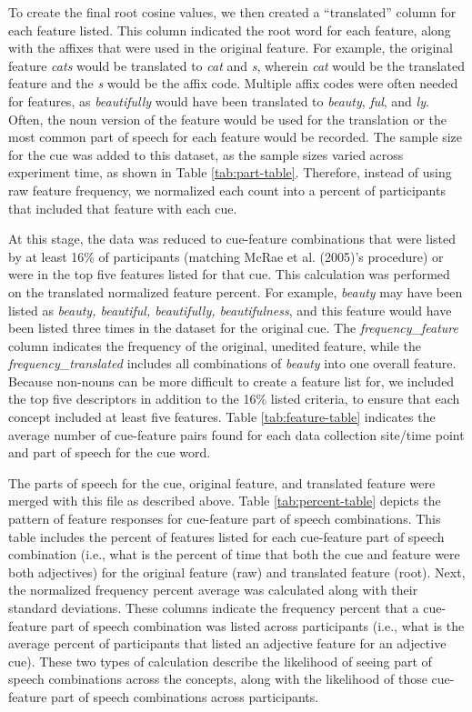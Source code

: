 \documentclass[english,man]{apa6}
\theoremstyle{definition}
\theoremstyle{definition}
\theoremstyle{definition}
\theoremstyle{remark}
\begin{document}
To create the final root cosine values, we then created a
\enquote{translated} column for each feature listed. This column
indicated the root word for each feature, along with the affixes that
were used in the original feature. For example, the original feature
\emph{cats} would be translated to \emph{cat} and \emph{s}, wherein
\emph{cat} would be the translated feature and the \emph{s} would be the
affix code. Multiple affix codes were often needed for features, as
\emph{beautifully} would have been translated to \emph{beauty},
\emph{ful}, and \emph{ly}. Often, the noun version of the feature would
be used for the translation or the most common part of speech for each
feature would be recorded. The sample size for the cue was added to this
dataset, as the sample sizes varied across experiment time, as shown in
Table \ref{tab:part-table}. Therefore, instead of using raw feature
frequency, we normalized each count into a percent of participants that
included that feature with each cue.

At this stage, the data was reduced to cue-feature combinations that
were listed by at least 16\% of participants (matching McRae et al.
(2005)'s procedure) or were in the top five features listed for that
cue. This calculation was performed on the translated normalized feature
percent. For example, \emph{beauty} may have been listed as
\emph{beauty, beautiful, beautifully, beautifulness}, and this feature
would have been listed three times in the dataset for the original cue.
The \emph{frequency\_feature} column indicates the frequency of the
original, unedited feature, while the \emph{frequency\_translated}
includes all combinations of \emph{beauty} into one overall feature.
Because non-nouns can be more difficult to create a feature list for, we
included the top five descriptors in addition to the 16\% listed
criteria, to ensure that each concept included at least five features.
Table \ref{tab:feature-table} indicates the average number of
cue-feature pairs found for each data collection site/time point and
part of speech for the cue word.

The parts of speech for the cue, original feature, and translated
feature were merged with this file as described above. Table
\ref{tab:percent-table} depicts the pattern of feature responses for
cue-feature part of speech combinations. This table includes the percent
of features listed for each cue-feature part of speech combination
(i.e., what is the percent of time that both the cue and feature were
both adjectives) for the original feature (raw) and translated feature
(root). Next, the normalized frequency percent average was calculated
along with their standard deviations. These columns indicate the
frequency percent that a cue-feature part of speech combination was
listed across participants (i.e., what is the average percent of
participants that listed an adjective feature for an adjective cue).
These two types of calculation describe the likelihood of seeing part of
speech combinations across the concepts, along with the likelihood of
those cue-feature part of speech combinations across participants.
\end{document}
